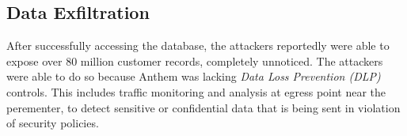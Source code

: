 	\subsection{Data Exfiltration}
	After successfully accessing the database, the attackers reportedly were able to expose over 80 million customer records, completely unnoticed. The attackers were able to do so because Anthem was lacking \textit{Data Loss Prevention (DLP)} controls. This includes traffic monitoring and analysis at egress point near the perementer, to detect sensitive or confidential data that is being sent in violation of security policies.
